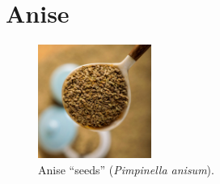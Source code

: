 


\section{Anise}
\label{sec:anise}




\begin{figure}
	\vspace{-\baselineskip}
	\includegraphics[width=0.33\textwidth]{imgs/spices/anise-s.jpg}
	\caption{Anise ``seeds'' (\textit{Pimpinella anisum}).}
	\label{fig:anise}
\end{figure}


